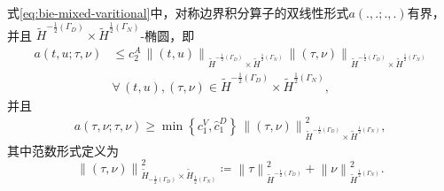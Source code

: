 \begin{lemma}
  \label{lemma:bie-mixed-var-bilinear-ellipticity}
  式\eqref{eq:bie-mixed-varitional}中，对称边界积分算子的双线性形式$a(.,.;.,.)$有界，并且
  $\widetilde{H}^{-\frac{1}{2}(\Gamma_{D})} \times \widetilde{H}^{\frac{1}{2}(\Gamma_{N})}$-椭圆，即
  \begin{equation}
    \label{eq:bie-mixed-var-bilinear-ellipticity-1}
    \begin{split}
      a(t,u;\tau,\nu) & \le
      c_{2}^{A} \,
      \left\| \left( t, u \right) \right\|_{
      \widetilde{H}^{-\frac{1}{2}(\Gamma_{D})} \times \widetilde{H}^{\frac{1}{2}(\Gamma_{N})}
      } \,
      \left\| \left( \tau, \nu \right) \right\|_{
      \widetilde{H}^{-\frac{1}{2}(\Gamma_{D})} \times \widetilde{H}^{\frac{1}{2}(\Gamma_{N})}
      } \\
      & \forall \, (t,u),(\tau, \nu) \in \widetilde{H}^{-\frac{1}{2}(\Gamma_{D})} \times \widetilde{H}^{\frac{1}{2}(\Gamma_{N})},
    \end{split}
  \end{equation}
  并且
  \begin{equation}
    \label{eq:bie-mixed-var-bilinear-ellipticity-2}
    \begin{split}
      a(\tau, \nu; \tau, \nu) \ge
      \min \left\{ c_{1}^{V}, \hat{c}_{1}^{D} \right\} \,
      \left\| ( \tau, \nu ) \right\|_{
      \widetilde{H}^{-\frac{1}{2}(\Gamma_{D})} \times \widetilde{H}^{\frac{1}{2}(\Gamma_{N})}
      }^{2},
    \end{split}
  \end{equation}
  其中范数形式定义为
  \begin{equation*}
    \left\| ( \tau, \nu ) \right\|_{
    \widetilde{H}_{-\frac{1}{2}(\Gamma_{D})} \times \widetilde{H}_{\frac{1}{2}(\Gamma_{N})}
    }^{2}
    \coloneqq
    \left\| \tau \right\|_{\widetilde{H}^{-\frac{1}{2}(\Gamma_{D})}}^{2}
    + \left\| \nu \right\|_{\widetilde{H}^{\frac{1}{2}(\Gamma_{N})}}^{2}.
  \end{equation*}
\end{lemma}
